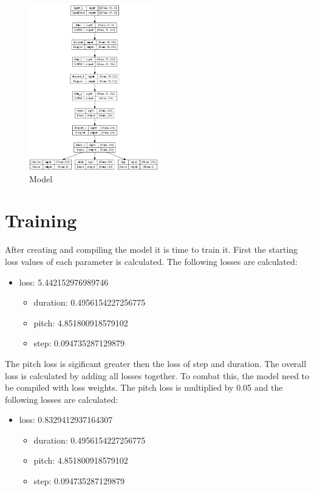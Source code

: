 \begin{figure}
\centering
\includegraphics[width=0.5\textwidth]{./pics/model_plot.png}
\caption{Model}
\label{fig:model}    
\end{figure}

\section{Training}
\label{training}

After creating and compiling the model it is time to train it. First the starting loss values of each parameter is calculated. The following losses
are calculated:

\begin{itemize}
  \item loss: 5.442152976989746
  \begin{itemize}
  \item duration: 0.4956154227256775
  \item pitch: 4.851800918579102
  \item step: 0.094735287129879
  \end{itemize}
\end{itemize}

The pitch loss is sigificant greater then the loss of step and duration. The overall loss is calculated by adding all losses together.
To combat this, the model need to be compiled with loss weights. The pitch loss is multiplied by 0.05 and the following losses 
are calculated:

\begin{itemize}
  \item loss: 0.8329412937164307
  \begin{itemize}
  \item duration: 0.4956154227256775
  \item pitch: 4.851800918579102
  \item step: 0.094735287129879
  \end{itemize}
\end{itemize}

